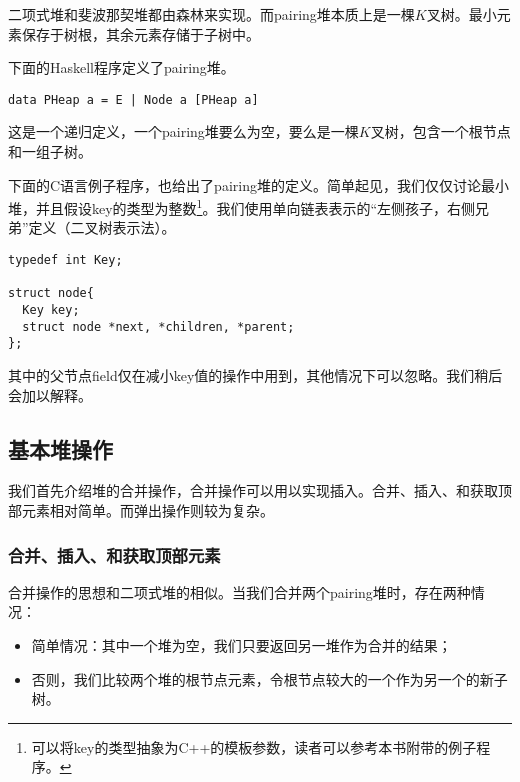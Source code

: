 \documentclass[UTF8]{article}
\begin{document}
二项式堆和斐波那契堆都由森林来实现。而pairing堆本质上是一棵$K$叉树。最小元素保存于树根，其余元素存储于子树中。

下面的Haskell程序定义了pairing堆。

\lstset{language=Haskell}
\begin{lstlisting}
data PHeap a = E | Node a [PHeap a]
\end{lstlisting}

这是一个递归定义，一个pairing堆要么为空，要么是一棵$K$叉树，包含一个根节点和一组子树。

下面的C语言例子程序，也给出了pairing堆的定义。简单起见，我们仅仅讨论最小堆，并且假设key的类型为整数\footnote{可以将key的类型抽象为C++的模板参数，读者可以参考本书附带的例子程序。}。我们使用单向链表表示的“左侧孩子，右侧兄弟”定义（二叉树表示法\cite{CLRS}）。

\lstset{language=C}
\begin{lstlisting}
typedef int Key;

struct node{
  Key key;
  struct node *next, *children, *parent;
};
\end{lstlisting}

其中的父节点field仅在减小key值的操作中用到，其他情况下可以忽略。我们稍后会加以解释。


\subsection{基本堆操作}

我们首先介绍堆的合并操作，合并操作可以用以实现插入。合并、插入、和获取顶部元素相对简单。而弹出操作则较为复杂。

\subsubsection{合并、插入、和获取顶部元素}
 

合并操作的思想和二项式堆的相似。当我们合并两个pairing堆时，存在两种情况：

\begin{itemize}
\item 简单情况：其中一个堆为空，我们只要返回另一堆作为合并的结果；

\item 否则，我们比较两个堆的根节点元素，令根节点较大的一个作为另一个的新子树。
\end{itemize}
\end{document}

